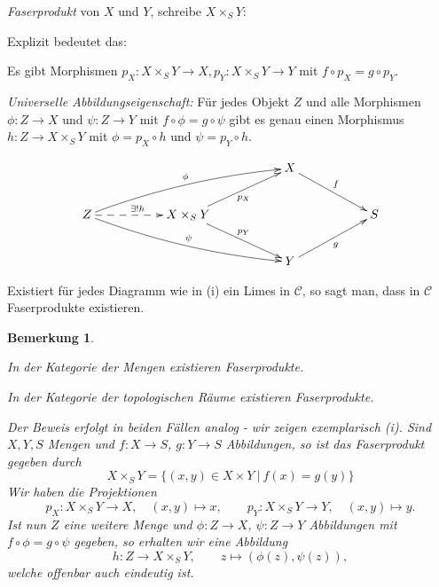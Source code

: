 \documentclass[11pt]{book}
\newtheorem{remark}[theorem]{Bemerkung}
\theoremstyle{nonumberbreak}
\newenvironment{defin}[1][]{\ifthenelse{\equal{#1}{}}{\definition}{\definition[#1]}\rm}{\enddefinition}
\newenvironment{pr}[1][]{\ifthenelse{\equal{#1}{}}{\proof}{\proof[#1]}\rm}{\endproof}
\begin{document}
\begin{spacing}{1.4}
\begin{defin}
\begin{compactenum}
 \textit{Faserprodukt} von $X$ und $Y$, schreibe $X \times_S Y$:
\item Explizit bedeutet das:
\begin{compactenum}
\item Es gibt Morphismen $p_X: X \times_S Y \longrightarrow X, p_Y: X \times_S Y \longrightarrow Y$ mit $f \circ p_X = g \circ p_Y$.
\item \textit{Universelle Abbildungseigenschaft:} Für jedes Objekt $Z$ und alle Morphismen $\phi: Z \longrightarrow X$ und $\psi: Z \longrightarrow Y$ mit $f \circ \phi = g \circ \psi$ gibt es genau einen Morphismus $h: Z \longrightarrow X \times_S Y$ mit $\phi = p_X \circ h$ und $\psi = p_Y \circ h$.
\end{compactenum}

$$
\begin{xy}
\xymatrix{
 && && X \ar[rrd]^{f} && \\
 Z \ar@{-->}[rr]^{\exists !h} \ar @/^/[rrrru]^{\phi} \ar @/_/[rrrrd]^{\psi} && X \times_S Y \ar[rru]_{p_X} \ar[rrd]^{p_Y} &&&& S \\
 && && Y \ar[rru]_{g} && 
}
\end{xy}
$$

\item Existiert für jedes Diagramm wie in (i) ein Limes in $\mathcal{C}$, so sagt man, dass in $\mathcal{C}$ Faserprodukte existieren.


\end{compactenum}
\end{defin}

\newcommand{\la}{\longrightarrow}

\begin{remark}  %
\begin{compactenum}
\item In der Kategorie der Mengen existieren Faserprodukte.
\item In der Kategorie der topologischen Räume existieren Faserprodukte.
\end{compactenum}
\begin{pr}
Der Beweis erfolgt in beiden Fällen analog - wir zeigen exemplarisch (i). Sind $X,Y,S$ Mengen und $f: X \longrightarrow S$, $g:Y \longrightarrow S$ Abbildungen, so ist das Faserprodukt gegeben durch 
$$X \times_S Y = \{ (x,y) \in X \times Y \ \vert \ f(x) = g(y) \}$$
Wir haben die Projektionen
$$p_X: X \times_S Y \longrightarrow X, \quad (x,y) \mapsto x, \qquad p_Y: X \times_S Y \longrightarrow Y, \quad (x,y) \mapsto y.$$
Ist nun $Z$ eine weitere Menge und $\phi: Z \la X$, $\psi: Z \la Y$ Abbildungen mit $f \circ \phi = g \circ \psi$ gegeben, so erhalten wir eine Abbildung
$$h: Z \longrightarrow X \times_S Y, \qquad z \mapsto \left( \phi(z), \psi(z) \right),$$
welche offenbar auch eindeutig ist.


\end{pr}
\end{remark}
\end{spacing}
\end{document}
